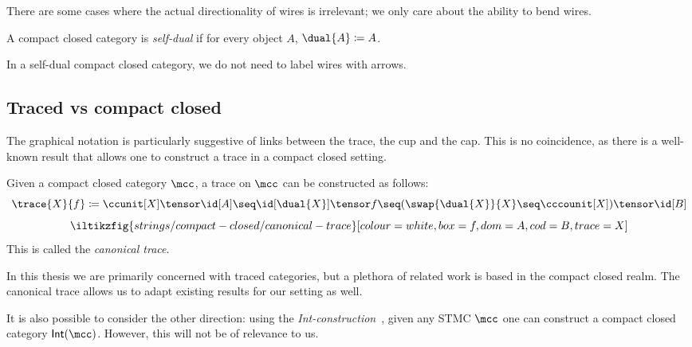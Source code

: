 

There are some cases where the actual directionality of wires is irrelevant;
we only care about the ability to bend wires.

\begin{definition}
    A compact closed category is \emph{self-dual} if for every object \(A\),
    \(\dual{A} \coloneqq A\).
\end{definition}

In a self-dual compact closed category, we do not need to label wires with
arrows.

\subsection{Traced vs compact closed}

The graphical notation is particularly suggestive of links between the
trace, the cup and the cap.
This is no coincidence, as there is a well-known result that allows one to
construct a trace in a compact closed setting.

\begin{proposition}
    \label{prop:canonical-trace}
    Given a compact closed category \(\mcc\), a trace on \(\mcc\) can be
    constructed as follows: \[
        \trace{X}{f}
        \coloneqq
        \ccunit[X] \tensor \id[A]
        \seq
        \id[\dual{X}] \tensor f
        \seq
        (\swap{\dual{X}}{X} \seq \cccounit[X]) \tensor \id[B]
    \]
    \[
        \iltikzfig{strings/compact-closed/canonical-trace}[colour=white,box=f,dom=A,cod=B,trace=X]
    \]
    This is called the \emph{canonical trace}.
\end{proposition}

In this thesis we are primarily concerned with traced categories, but a plethora
of related work is based in the compact closed realm.
The canonical trace allows us to adapt existing results for our setting as well.

\begin{remark}
    It is also possible to consider the other direction: using the
    \emph{Int-construction}~\cite{joyal1996traced}, given any STMC
    \(\mcc\) one can construct a compact closed category \(\mathsf{Int}(\mcc)\).
    However, this will not be of relevance to us.
\end{remark}